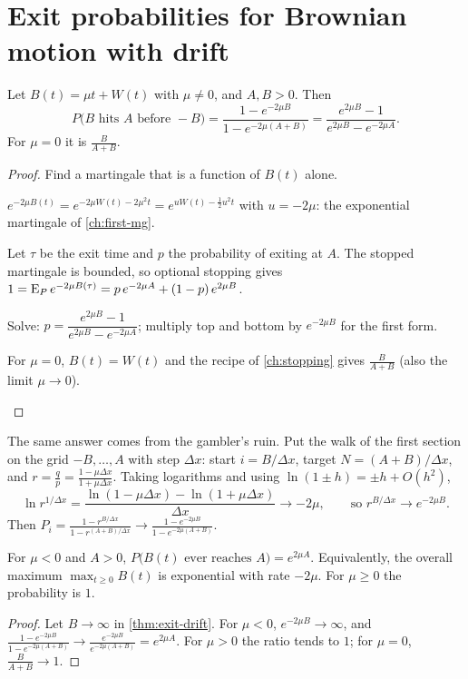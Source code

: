\section{Exit probabilities for Brownian motion with drift}

\begin{theorem}
\label{thm:exit-drift}
Let $B(t)=\mu t+W(t)$ with $\mu\ne0$, and $A,B>0$. Then
\[
  P\big(B\text{ hits }A\text{ before }-B\big)=\frac{1-e^{-2\mu B}}{1-e^{-2\mu(A+B)}}=\frac{e^{2\mu B}-1}{e^{2\mu B}-e^{-2\mu A}} .
\]
For $\mu=0$ it is $\frac{B}{A+B}$.
\end{theorem}
\begin{proof}
Find a martingale that is a function of $B(t)$ alone.
\begin{steps}
  \item $e^{-2\mu B(t)}=e^{-2\mu W(t)-2\mu^2t}=e^{uW(t)-\frac12u^2t}$ with $u=-2\mu$: the exponential martingale of \cref{ch:first-mg}.
  \item Let $\tau$ be the exit time and $p$ the probability of exiting at $A$. The stopped martingale is bounded, so optional stopping gives $1=\operatorname{E}_Pe^{-2\mu B(\tau)}=p\,e^{-2\mu A}+(1-p)\,e^{2\mu B}$.
  \item Solve: $p=\dfrac{e^{2\mu B}-1}{e^{2\mu B}-e^{-2\mu A}}$; multiply top and bottom by $e^{-2\mu B}$ for the first form.
  \item For $\mu=0$, $B(t)=W(t)$ and the recipe of \cref{ch:stopping} gives $\frac{B}{A+B}$ (also the limit $\mu\to0$). \qedhere
\end{steps}
\end{proof}

\begin{remark}
The same answer comes from the gambler's ruin. Put the walk of the first section on the grid $-B,\dots,A$ with step $\Delta x$: start $i=B/\Delta x$, target $N=(A+B)/\Delta x$, and $r=\frac qp=\frac{1-\mu\Delta x}{1+\mu\Delta x}$. Taking logarithms and using $\ln(1\pm h)=\pm h+O(h^2)$,
\[
  \ln r^{1/\Delta x}=\frac{\ln(1-\mu\Delta x)-\ln(1+\mu\Delta x)}{\Delta x}\to-2\mu,\qquad\text{so } r^{B/\Delta x}\to e^{-2\mu B}.
\]
Then $P_i=\frac{1-r^{B/\Delta x}}{1-r^{(A+B)/\Delta x}}\to\frac{1-e^{-2\mu B}}{1-e^{-2\mu(A+B)}}$.
\end{remark}

\begin{result}
\label{res:ever}
For $\mu<0$ and $A>0$, $P\big(B(t)\text{ ever reaches }A\big)=e^{2\mu A}$. Equivalently, the overall maximum $\max_{t\ge0}B(t)$ is exponential with rate $-2\mu$. For $\mu\ge0$ the probability is $1$.
\end{result}
\begin{proof}
Let $B\to\infty$ in \cref{thm:exit-drift}. For $\mu<0$, $e^{-2\mu B}\to\infty$, and $\frac{1-e^{-2\mu B}}{1-e^{-2\mu(A+B)}}\to\frac{e^{-2\mu B}}{e^{-2\mu(A+B)}}=e^{2\mu A}$. For $\mu>0$ the ratio tends to $1$; for $\mu=0$, $\frac{B}{A+B}\to1$.
\end{proof}

